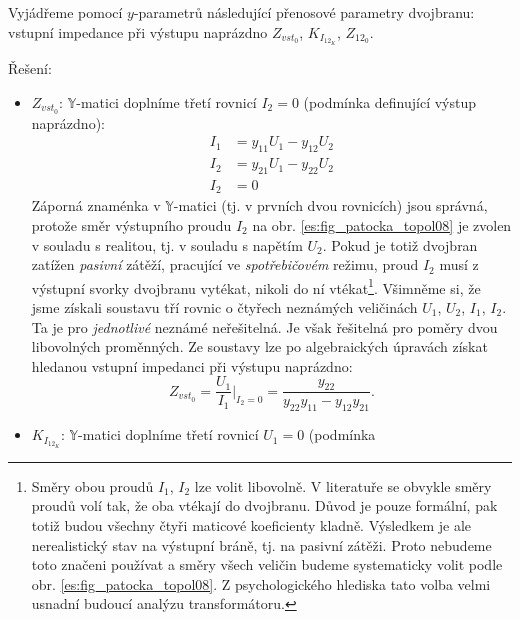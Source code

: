 \begin{example}\label{TEO:exam016}
  Vyjádřeme pomocí \(y\)-parametrů následující přenosové parametry dvojbranu: vstupní impedance při 
  výstupu naprázdno \(Z_{vst_0}\), \(K_{I_{12_K}}\), \(Z_{12_0}\). 
  
  Řešení:
  \begin{itemize}[noitemsep]
    \item \(Z_{vst_0}\): \(\mathbb{Y}\)-matici doplníme třetí rovnicí \(I_2=0\) (podmínka 
    definující výstup naprázdno):
    \begin{subequations}\label{ES:eq_topol10}
      \begin{align}
        I_1 &= y_{11}U_1 - y_{12}U_2  \\
        I_2 &= y_{21}U_1 - y_{22}U_2  \\
        I_2 &= 0
      \end{align}
    \end{subequations}
    Záporná znaménka v \(\mathbb{Y}\)-matici (tj. v prvních dvou rovnicích) jsou správná, protože 
    směr výstupního proudu \(I_2\) na obr. \ref{es:fig_patocka_topol08} je zvolen v souladu s 
    realitou, tj. v souladu s napětím \(U_2\). Pokud je totiž dvojbran zatížen \emph{pasivní} 
    zátěží, pracující ve \emph{spotřebičovém} režimu, proud \(I_2\) musí z výstupní svorky 
    dvojbranu vytékat, nikoli do ní vtékat\footnote{Směry obou proudů \(I_1\), \(I_2\) lze volit 
    libovolně. V literatuře se obvykle směry proudů volí tak, že oba vtékají do dvojbranu. Důvod je 
    pouze formální, pak totiž budou všechny čtyři maticové koeficienty kladně. Výsledkem je ale 
    nerealistický stav na výstupní bráně, tj. na pasivní zátěži. Proto nebudeme toto značeni 
    používat a směry všech veličin budeme systematicky volit podle obr. 
    \ref{es:fig_patocka_topol08}. Z psychologického hlediska tato volba velmi usnadní budoucí 
    analýzu transformátoru.}. Všimněme si, že jsme získali soustavu tří rovnic o čtyřech neznámých 
    veličinách \(U_1\), \(U_2\), \(I_1\), \(I_2\). Ta je pro \emph{jednotlivé} neznámé neřešitelná. 
    Je však řešitelná pro poměry dvou libovolných proměnných. Ze soustavy lze po algebraických 
    úpravách získat hledanou vstupní impedanci při výstupu naprázdno:
    \begin{equation}\label{ES:eq_topol11}
    Z_{vst_0} = \frac{U_1}{I_1}\Bigg\lvert_{I_2=0} 
    = \frac{y_{22}}{y_{22}y_{11} - y_{12}y_{21}}.
    \end{equation}
    \item \(K_{I_{12_K}}\): \(\mathbb{Y}\)-matici doplníme třetí rovnicí \(U_1 = 0\) (podmínka 

\end{itemize}
\end{example}
